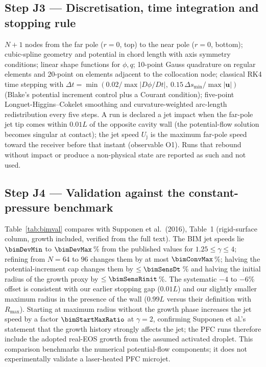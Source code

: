 \subsection{Step J3 --- Discretisation, time integration and stopping rule}
$N+1$ nodes from the far pole ($r=0$, top) to the near pole ($r=0$, bottom); cubic-spline geometry and
potential in chord length with axis symmetry conditions; linear shape functions for $\phi,q$; 10-point
Gauss quadrature on regular elements and 20-point on elements adjacent to the collocation node; classical
RK4 time stepping with $\Delta t=\min(0.02/\max|D\phi/Dt|,\ 0.15\,\Delta s_{\min}/\max|\mathbf u|)$ (Blake's potential
increment control plus a Courant condition); five-point Longuet-Higgins--Cokelet smoothing and
curvature-weighted arc-length redistribution every five steps. A run is declared a jet impact when the
far-pole jet tip comes within $0.01L$ of the opposite cavity wall (the potential-flow solution becomes
singular at contact); the jet speed $U_{\mathrm j}$ is the maximum far-pole speed toward the receiver
before that instant (observable O1). Runs that rebound without impact or produce a non-physical state are
reported as such and not used.

\subsection{Step J4 --- Validation against the constant-pressure benchmark}
Table~\ref{tab:bimval} compares with Supponen et al.\ (2016), Table~1 (rigid-surface column, growth
included, verified from the full text). The BIM jet speeds lie $\bimDevMin$ to $\bimDevMax$\,\% from the
published values for $1.25\le\gamma\le4$; refining from $N=64$ to $96$ changes them by at most
$\bimConvMax$\,\%; halving the potential-increment cap changes them by $\le\bimSensDt$\,\% and halving the initial radius of
the growth proxy by $\le\bimSensRinit$\,\%. The systematic $-4$ to $-6$\% offset is consistent with our
earlier stopping gap ($0.01L$) and our slightly smaller maximum radius in the presence of the wall
($0.99L$ versus their definition with $R_{\max}$). Starting at maximum radius without the growth phase
increases the jet speed by a factor $\bimStartMaxRatio$ at $\gamma=2$, confirming Supponen et al.'s
statement that the growth history strongly affects the jet; the PFC runs therefore include the
adopted real-EOS growth from the assumed activated droplet. This comparison benchmarks the numerical
potential-flow components; it does not experimentally validate a laser-heated PFC microjet.



